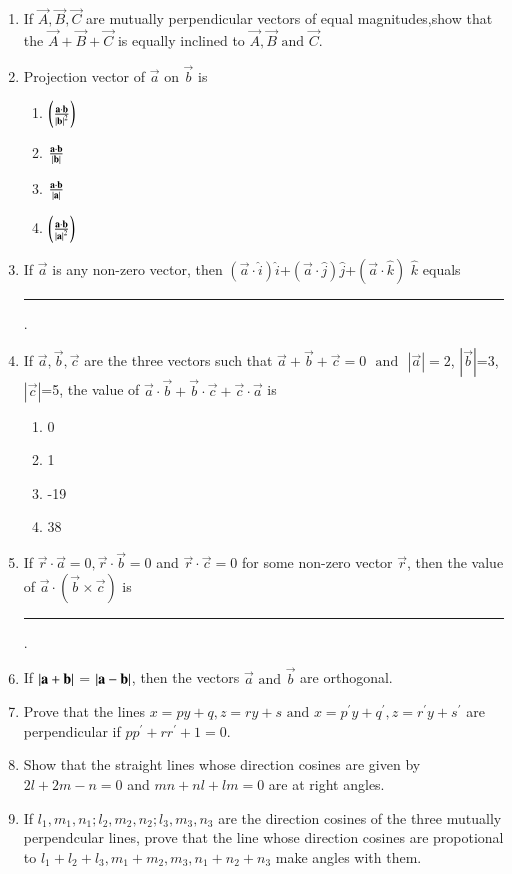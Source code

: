 \begin{enumerate}[label=\thesubsection.\arabic*,ref=\thesubsection.\theenumi]
    \item If $ \vec{A},\vec{B},\vec{C} $ are mutually perpendicular vectors of equal magnitudes,show that the  $ \vec{A}+\vec{B}+\vec{C} $ is equally inclined to $ \vec{A},\vec{B}  \text{ and }  \vec{C} $.
\item Projection vector of $\vec{a}$ on $\vec{b}$ is
	\begin{enumerate}
\item $\left(\frac{\mathbf{a}\cdot\mathbf{b}}{\left\vert\mathbf{b}\right\vert^2}\right)$
\item $\frac{\mathbf{a}\cdot\mathbf{b}}{\left\vert\mathbf{b}\right\vert}$
\item $\frac{\mathbf{a}\cdot\mathbf{b}}{\left\vert\mathbf{a}\right\vert}$
\item $\left(\frac{\mathbf{a}\cdot\mathbf{b}}{\left\vert\mathbf{a}\right\vert^2}\right)$
\end{enumerate}
\item If $\vec{a}$ is  any non-zero vector, then $(\vec{a}\cdot \hat{i})\hat{i}$+$(\vec{a}\cdot \hat{j})\hat{j}$+$(\vec{a}\cdot \hat{k})$ $\hat{k}$ equals \rule{1cm}{0.15mm}.
\item If $\vec{a},\vec{b},\vec{c}$ are the three vectors such that $\vec{a}+\vec{b}+\vec{c}=0$ $\text{ and }$ $|\vec{a}|=2$, $|\vec{b}|$=3, $|\vec{c}|$=5, the value of $\vec{a} \cdot \vec{b}+\vec{b} \cdot \vec{c}+\vec{c} \cdot \vec{a}$ is
	\begin{enumerate}
\item 0
\item 1	
\item -19
\item 38
\end{enumerate}
\item If $\vec{r}\cdot\vec{a}=0, \vec{r}\cdot\vec{b}=0$ and $\vec{r}\cdot\vec{c}=0$ for some non-zero vector $\vec{r}$, then the value of $\vec{a}\cdot(\vec{b}\times\vec{c})$ is \rule{1cm}{0.15mm}.
\item If $\left\vert\mathbf{a}+\mathbf{b}\right\vert$ = $\left\vert\mathbf{a}-\mathbf{b}\right\vert$, then the vectors $\vec{a}$ $\text {and}$ $\vec{b}$ are orthogonal.
\item Prove that the lines $x=py+q , z=ry+s \text{ and } x=p^{\prime}y+q^{\prime}, z=r^{\prime}y+s^{\prime} $ are perpendicular if $pp^{\prime}+rr^{\prime}+1=0$.
\item Show that the straight lines whose direction cosines are given by $2l+2m-n=0$ and $mn+nl+lm=0$ are at right angles.
\item If $l_1, m_1, n_1;l_2, m_2, n_2;l_3, m_3, n_3$ are the direction cosines of the three mutually perpendcular lines, prove that the line whose direction cosines are propotional to $l_1+l_2+l_3 , m_1+m_2,m_3, n_1+n_2+n_3$ make angles with them.

\end{enumerate}
